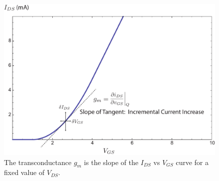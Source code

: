 \begin{figure}[tb]
\centering
\includegraphics[width=.75\columnwidth]{id_vgs_slope}
\caption{The transconductance $g_m$ is the slope of the $I_{DS}$ vs $V_{GS}$ curve for a fixed value of $V_{DS}$.}
\label{fig:id_vgs_slope}
\end{figure}
